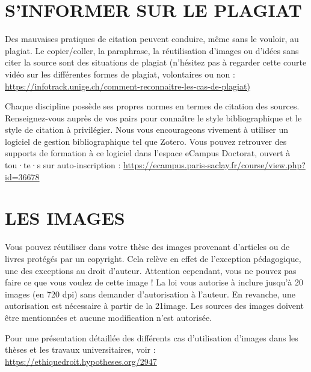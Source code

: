 \documentclass[french,12pt,a4paper]{book}
\begin{document}
\section{S'INFORMER SUR LE PLAGIAT}
Des mauvaises pratiques de citation peuvent conduire, même sans le vouloir, au plagiat. Le copier/coller, la paraphrase, la réutilisation d’images ou d’idées sans citer la source sont des situations de plagiat (n’hésitez pas à regarder cette courte vidéo sur les différentes formes de plagiat, volontaires ou non : \url{https://infotrack.unige.ch/comment-reconnaitre-les-cas-de-plagiat)}\\ \par
Chaque discipline possède ses propres normes en termes de citation des sources. Renseignez-vous auprès de vos pairs pour connaître le style bibliographique et le style de citation à privilégier. Nous vous encourageons vivement à utiliser un logiciel de gestion bibliographique tel que Zotero. Vous pouvez retrouver des supports de formation à ce logiciel dans l’espace eCampus Doctorat, ouvert à tou·te·s sur auto-inscription : \url{https://ecampus.paris-saclay.fr/course/view.php?id=36678}

\section{LES IMAGES}
Vous pouvez réutiliser dans votre thèse des images provenant d’articles ou de livres protégés par un copyright. Cela relève en effet de l’exception pédagogique, une des exceptions au droit d’auteur. Attention cependant, vous ne pouvez pas faire ce que vous voulez de cette image ! La loi vous autorise à inclure jusqu’à 20 images (en 720 dpi) sans demander d’autorisation à l’auteur. En revanche, une autorisation est nécessaire à partir de la 21\ieme image. Les sources des images doivent être mentionnées et aucune modification n’est autorisée.\\ \par
Pour une présentation détaillée des différents cas d’utilisation d’images dans les thèses et les travaux universitaires, voir : \url{https://ethiquedroit.hypotheses.org/2947}
\end{document}
